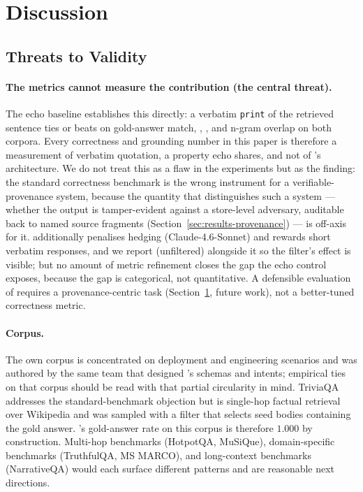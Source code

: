 \section{Discussion}
\label{sec:discussion}

\subsection{Threats to Validity}
\label{sec:threats}

\paragraph{The metrics cannot measure the contribution (the
central threat).} The echo baseline establishes this directly: a
verbatim \texttt{print} of the retrieved sentence ties or beats
\hyphae{} on gold-answer match, \unsupf{}, \unsupr{}, and n-gram
overlap on both corpora. Every correctness and grounding number
in this paper is therefore a measurement of verbatim quotation,
a property echo shares, and not of \hyphae{}'s architecture. We
do not treat this as a flaw in the experiments but as the
finding: the standard correctness benchmark is the wrong
instrument for a verifiable-provenance system, because the
quantity that distinguishes such a system --- whether the output
is tamper-evident against a store-level adversary, auditable back
to named source fragments (Section~\ref{sec:results-provenance})
--- is off-axis for it. \unsupf{} additionally penalises hedging
(Claude-4.6-Sonnet) and rewards short verbatim responses, and we
report \unsupr{} (unfiltered) alongside it so the filter's effect
is visible; but no amount of metric refinement closes the gap the
echo control exposes, because the gap is categorical, not
quantitative. A defensible evaluation of \hyphae{} requires a
provenance-centric task (Section~\ref{sec:discussion}, future
work), not a better-tuned correctness metric.

\paragraph{Corpus.} The own corpus is concentrated on
deployment and engineering scenarios and was authored by the
same team that designed \hyphae{}'s schemas and intents;
empirical ties on that corpus should be read with that partial
circularity in mind. TriviaQA addresses the standard-benchmark
objection but is single-hop factual retrieval over Wikipedia
and was sampled with a filter that selects seed bodies
containing the gold answer. \hyphae{}'s gold-answer rate on
this corpus is therefore $1.000$ by construction. Multi-hop
benchmarks (HotpotQA, MuSiQue), domain-specific benchmarks
(TruthfulQA, MS MARCO), and long-context benchmarks
(NarrativeQA) would each surface different patterns and are
reasonable next directions.

